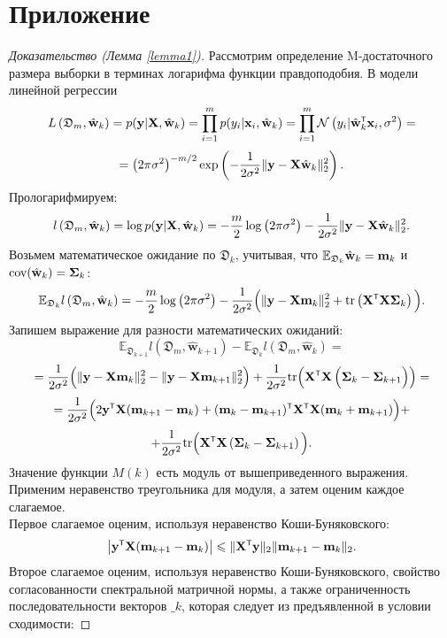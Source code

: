 \section{Приложение}

\begin{proof}[Доказательство (Лемма \ref{lemma1})]
    Рассмотрим определение M-достаточного размера выборки в терминах логарифма функции правдоподобия. В модели линейной регрессии
    \[ L\left( \mathfrak{D}_m, \hat{\bw}_k \right) = p(\by | \bX, \hat{\bw}_k) = \prod_{i=1}^{m} p(y_i | \bx_i, \hat{\bw}_k) = \prod_{i=1}^{m} \mathcal{N}\left( y_i | \hat{\bw}_k\T \bx_i, \sigma^2 \right) = \]
    \[ = \left( 2\pi\sigma^2 \right)^{-m/2} \exp\left( -\dfrac{1}{2\sigma^2} \| \mathbf{y} - \mathbf{X} \hat{\mathbf{w}}_k \|_2^2 \right). \]
    Прологарифмируем:
    \[ l\left( \mathfrak{D}_m, \hat{\mathbf{w}}_k \right) = \log p(\mathbf{y} | \mathbf{X}, \hat{\mathbf{w}}_k) = -\dfrac{m}{2}\log\left( 2\pi\sigma^2 \right) - \dfrac{1}{2\sigma^2} \| \mathbf{y} - \mathbf{X} \hat{\mathbf{w}}_k \|_2^2. \]
    Возьмем математическое ожидание по $\mathfrak{D}_k$, учитывая, что $\mathbb{E}_{\mathfrak{D}_k}\hat{\mathbf{w}}_k = \mathbf{m}_k$ и $\text{cov}(\hat{\mathbf{w}}_k) = \boldsymbol{\Sigma}_k$:
    \[ \mathbb{E}_{\mathfrak{D}_k} l\left( \mathfrak{D}_m, \hat{\bw}_k \right) = -\dfrac{m}{2}\log\left( 2\pi\sigma^2 \right) - \dfrac{1}{2\sigma^2} \Big( \| \by - \bX \bm_k \|_2^2 + \text{tr}\left( \bX\T\bX \bSigma_k \right) \Big). \]
    Запишем выражение для разности математических ожиданий:
    \[ \mathbb{E}_{\mathfrak{D}_{k+1}} l(\mathfrak{D}_m, \hat{\mathbf{w}}_{k+1}) - \mathbb{E}_{\mathfrak{D}_k} l(\mathfrak{D}_m, \hat{\mathbf{w}}_{k}) = \]
    \[ = \dfrac{1}{2\sigma^2} \Big( \| \by - \bX \bm_k \|_2^2 - \| \by - \bX \bm_{k+1} \|_2^2 \Big) + \dfrac{1}{2\sigma^2} \text{tr} \Big( \bX\T\bX \left( \bSigma_k - \bSigma_{k+1} \Big) \right) = \]
    \[ = \dfrac{1}{2\sigma^2} \Big( 2 \by\T \bX (\bm_{k+1} - \bm_k) + (\bm_k - \bm_{k+1})\T \bX\T\bX (\bm_k + \bm_{k+1}) \Big) + \]
    \[ + \dfrac{1}{2\sigma^2} \text{tr} \Big( \bX\T\bX \left( \bSigma_k - \bSigma_{k+1} \right) \Big). \]
    Значение функции $M(k)$ есть модуль от вышеприведенного выражения. Применим неравенство треугольника для модуля, а затем оценим каждое слагаемое.\\
    Первое слагаемое оценим, используя неравенство Коши-Буняковского:
    \[ \big| \by\T\bX(\bm_{k+1}-\bm_k) \big| \leqslant \| \bX\T\by \|_2 \|\bm_{k+1} - \bm_k\|_2. \]
    Второе слагаемое оценим, используя неравенство Коши-Буняковского, свойство согласованности спектральной матричной нормы, а также ограниченность последовательности векторов $\bm_k$, которая следует из предъявленной в условии сходимости:

\end{proof}
